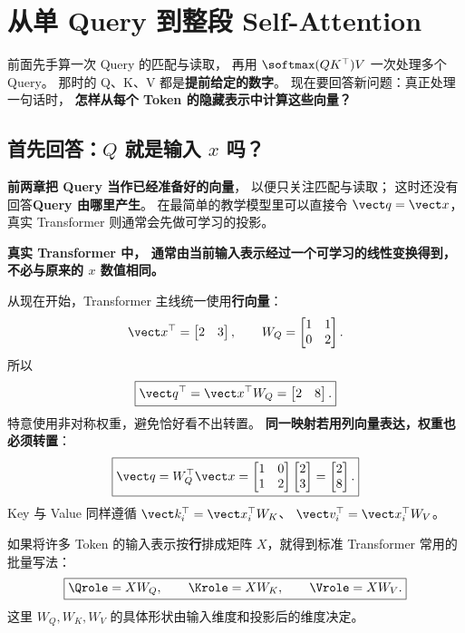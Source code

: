 \section{从单 Query 到整段 Self-Attention}
\label{concept:self-attention}
\label{intro:12-self-attention-matrices}

前面先手算一次 Query 的匹配与读取，
再用 $\softmax(QK^\top)V$ 一次处理多个 Query。
那时的 Q、K、V 都是\textbf{提前给定的数字}。
现在要回答新问题：真正处理一句话时，
\textbf{怎样从每个 Token 的隐藏表示中计算这些向量？}

\subsection{首先回答：$Q$ 就是输入 $x$ 吗？}

\textbf{前两章把 Query 当作已经准备好的向量}，
以便只关注匹配与读取；
这时还没有回答\textbf{Query 由哪里产生}。
在最简单的教学模型里可以直接令 $\vect q=\vect x$，
真实 Transformer 则通常会先做可学习的投影。

\textbf{真实 Transformer 中， 通常由当前输入表示经过一个可学习的线性变换得到，不必与原来的 $x$ 数值相同。}

从现在开始，Transformer 主线统一使用\textbf{行向量}：
\[
\vect x^\top=\begin{bmatrix}2&3\end{bmatrix},\qquad
W_Q=\begin{bmatrix}1&1\\0&2\end{bmatrix}.
\]
所以
\[
\boxed{\vect q^\top=\vect x^\top W_Q
=\begin{bmatrix}2&8\end{bmatrix}.}
\]
特意使用非对称权重，避免恰好看不出转置。
\textbf{同一映射若用列向量表达，权重也必须转置}：
\[
\boxed{\vect q=W_Q^\top\vect x
=\begin{bmatrix}1&0\\1&2\end{bmatrix}
\begin{bmatrix}2\\3\end{bmatrix}
=\begin{bmatrix}2\\8\end{bmatrix}.}
\]
Key 与 Value 同样遵循
$\vect k_i^\top=\vect x_i^\top W_K$、
$\vect v_i^\top=\vect x_i^\top W_V$。

如果将许多 Token 的输入表示按\textbf{行}排成矩阵 $X$，就得到标准 Transformer 常用的批量写法：
\begin{equation}
\boxed{\Qrole=XW_Q,\qquad \Krole=XW_K,\qquad \Vrole=XW_V.}
\label{eq:qkv-from-x}
\end{equation}
这里 $W_Q,W_K,W_V$ 的具体形状由输入维度和投影后的维度决定。
\begin{center}\QKVlegend\end{center}

